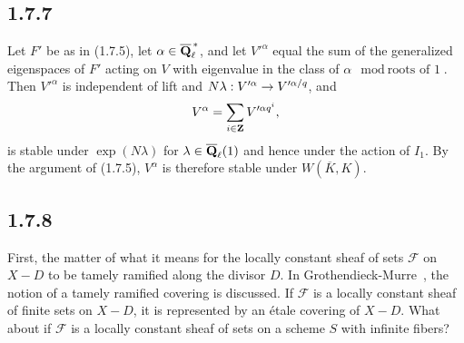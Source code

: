 \documentclass[deligne.tex]{subfiles}
\begin{document}
\subsection*{1.7.7} Let $F'$ be as in (1.7.5), let
$\alpha\in\overline{\mathbf{Q}}_\ell^{\,\ast}$, and let $V'^\alpha$ equal the
sum of the generalized eigenspaces of $F'$ acting on $V$ with eigenvalue
in the class of $\alpha\mod \text{roots of 1}$. Then $V'^\alpha$ is
independent of lift and $N\lambda:V'^\alpha\rightarrow V'^{\alpha/q}$, and
\begin{equation*}
	V^\alpha=\sum_{i\in\mathbf{Z}} V'^{\alpha q^i},
\end{equation*}
is stable under $\exp(N\lambda)$ for $\lambda\in\overline{\mathbf{Q}}_\ell(1)$ and
hence under the action of $I_1$. By the argument of (1.7.5), $V^\alpha$ is
therefore stable under $W(\overline K,K)$.

\subsection*{1.7.8}\label{1.7.8}
First, the matter of what it means for the locally constant sheaf of sets
$\mathscr F$ on $X-D$ to be tamely ramified along the divisor $D$.
In Grothendieck-Murre~\cite{GM}, the notion of a tamely ramified covering is
discussed. If $\mathscr F$ is a locally constant sheaf of finite sets on
$X-D$, it is represented by an étale covering of $X-D$.
What about if $\mathscr F$ is a locally constant sheaf of sets on a scheme
$S$ with infinite fibers?
\end{document}
